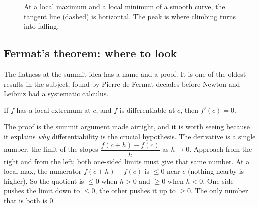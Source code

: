 \begin{figure}[H]
\centering
{}
\caption{At a local maximum and a local minimum of a smooth curve, the tangent
line (dashed) is horizontal. The peak is where climbing turns into falling.}
\label{ch16:fig-extrema}
\end{figure}

\subsection{Fermat's theorem: where to look}

The flatness-at-the-summit idea has a name and a proof. It is one of the oldest
results in the subject, found by Pierre de Fermat decades before Newton and
Leibniz had a systematic calculus.

\begin{theorem}\label{ch16:thm-fermat}
If $f$ has a local extremum at $c$, and $f$ is differentiable at $c$, then
$f'(c)=0$.
\end{theorem}

\begin{intuitionbox}
The proof is the summit argument made airtight, and it is worth seeing because it
explains \emph{why} differentiability is the crucial hypothesis. The derivative is
a single number, the limit of the slopes $\dfrac{f(c+h)-f(c)}{h}$ as $h\to 0$.
Approach from the right and from the left; both one-sided limits must give that
same number. At a local max, the numerator $f(c+h)-f(c)$ is $\le 0$ near $c$
(nothing nearby is higher). So the quotient is $\le 0$ when $h>0$ and $\ge 0$ when
$h<0$. One side pushes the limit down to $\le 0$, the other pushes it up to $\ge
0$. The only number that is both is $0$.
\end{intuitionbox}

